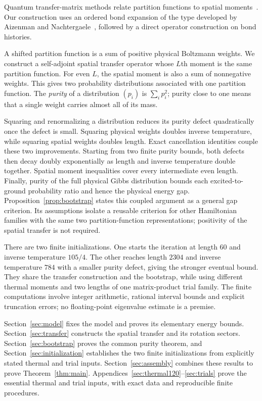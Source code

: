 Quantum transfer-matrix methods relate partition functions to spatial
moments~\cite{Suzuki1985}. Our construction uses an ordered bond
expansion of the type developed by Aizenman and
Nachtergaele~\cite[arXiv v1, Section~2.2]{AizenmanNachtergaele1994}, followed by a
direct operator construction on bond histories.

A shifted partition function is a sum of positive physical Boltzmann
weights. We construct a self-adjoint spatial transfer operator whose
$L$th moment is the same partition function. For even $L$, the spatial
moment is also a sum of nonnegative weights. This gives two probability
distributions associated with one partition function. The \emph{purity}
of a distribution $(p_i)$ is $\sum_i p_i^2$; purity close to one means
that a single weight carries almost all of its mass.

Squaring and renormalizing a distribution reduces its purity defect
quadratically once the defect is small. Squaring physical weights
doubles inverse temperature, while squaring spatial weights doubles
length. Exact cancellation identities couple these two improvements.
Starting from two finite purity bounds, both defects then decay doubly
exponentially as length and inverse temperature double together.
Spatial moment inequalities cover every intermediate even length.
Finally, purity of the full physical Gibbs distribution bounds each
excited-to-ground probability ratio and hence the physical energy gap.
Proposition~\ref{prop:bootstrap} states this coupled argument as a general
gap criterion. Its assumptions isolate a reusable criterion
for other Hamiltonian families with the same two partition-function
representations; positivity of the spatial transfer is not required.

There are two finite initializations. One starts the iteration at length
$60$ and inverse temperature $105/4$. The other reaches length $2304$
and inverse temperature $784$ with a smaller purity defect, giving the
stronger eventual bound. They share the transfer construction and the
bootstrap, while using different thermal moments and two lengths of one
matrix-product trial family.
The finite computations involve integer arithmetic, rational interval
bounds and explicit truncation errors; no floating-point eigenvalue
estimate is a premise.

Section~\ref{sec:model} fixes the model and proves its elementary energy
bounds. Section~\ref{sec:transfer} constructs the spatial transfer and
its rotation sectors. Section~\ref{sec:bootstrap} proves the common
purity theorem, and Section~\ref{sec:initialization} establishes the
two finite initializations from explicitly stated thermal and trial
inputs. Section~\ref{sec:assembly} combines these results to prove
Theorem~\ref{thm:main}. Appendices~\ref{sec:thermal120}--\ref{sec:trials}
prove the essential thermal and trial inputs, with exact data and
reproducible finite procedures.
